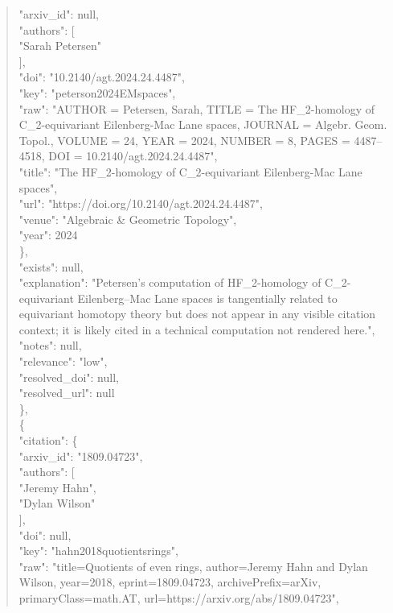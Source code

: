 \documentclass[11pt]{article}
\begin{document}
\begin{quote}
        "arxiv\_id": null,\\
        "authors": [\\
          "Sarah Petersen"\\
        ],\\
        "doi": "10.2140/agt.2024.24.4487",\\
        "key": "peterson2024EMspaces",\\
        "raw": "AUTHOR = Petersen, Sarah, TITLE = The HF\_2-homology of C\_2-equivariant Eilenberg-Mac Lane spaces, JOURNAL = Algebr. Geom. Topol., VOLUME = 24, YEAR = 2024, NUMBER = 8, PAGES = 4487--4518, DOI = 10.2140/agt.2024.24.4487",\\
        "title": "The HF\_2-homology of C\_2-equivariant Eilenberg-Mac Lane spaces",\\
        "url": "https://doi.org/10.2140/agt.2024.24.4487",\\
        "venue": "Algebraic \& Geometric Topology",\\
        "year": 2024\\
      \},\\
      "exists": null,\\
      "explanation": "Petersen's computation of HF\_2-homology of C\_2-equivariant Eilenberg--Mac Lane spaces is tangentially related to equivariant homotopy theory but does not appear in any visible citation context; it is likely cited in a technical computation not rendered here.",\\
      "notes": null,\\
      "relevance": "low",\\
      "resolved\_doi": null,\\
      "resolved\_url": null\\
    \},\\
    \{\\
      "citation": \{\\
        "arxiv\_id": "1809.04723",\\
        "authors": [\\
          "Jeremy Hahn",\\
          "Dylan Wilson"\\
        ],\\
        "doi": null,\\
        "key": "hahn2018quotientsrings",\\
        "raw": "title=Quotients of even rings, author=Jeremy Hahn and Dylan Wilson, year=2018, eprint=1809.04723, archivePrefix=arXiv, primaryClass=math.AT, url=https://arxiv.org/abs/1809.04723",\\

\end{quote}
\end{document}
